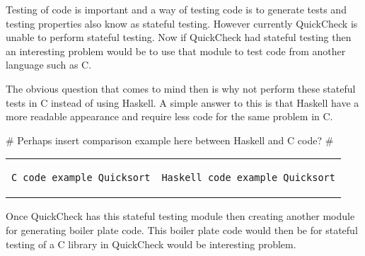 Testing of code is important and a way of testing code is to generate tests and testing properties also know as stateful testing.
However currently QuickCheck is unable to perform stateful testing.
Now if QuickCheck had stateful testing then an interesting problem would be to use that module to test code from another language such as C.

The obvious question that comes to mind then is why not perform these stateful tests in C instead of using Haskell.
A simple answer to this is that Haskell have a more readable appearance and require less code for the same problem in C.

$\#$ Perhaps insert comparison example here between Haskell and C code? $\#$

\begin{tabular}{l | l}
\begin{minipage}{2in}
\begin{verbatim}
C code example Quicksort
\end{verbatim}
\end{minipage}
&
\begin{minipage}{2in}
\begin{verbatim}
Haskell code example Quicksort
\end{verbatim}
\end{minipage}
\end{tabular}

Once QuickCheck has this stateful testing module then creating another module for generating boiler plate code.
This boiler plate code would then be for stateful testing of a C library in QuickCheck would be interesting problem.




